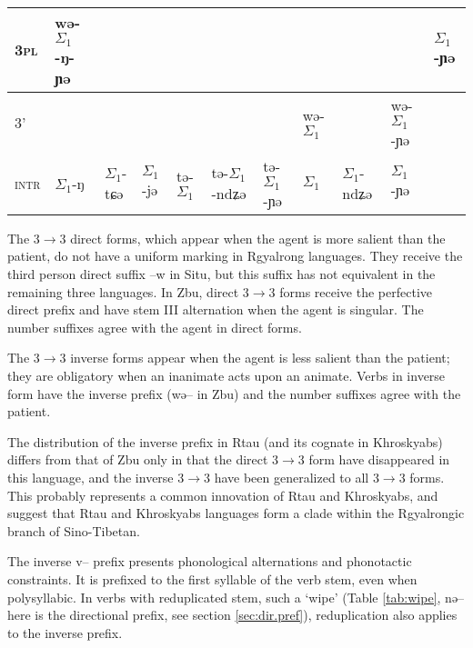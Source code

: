 \documentclass[oneside,a4paper,11pt]{article}
\newcommand{\ipa}[1]{{\phon #1}} %
\newcommand{\grise}[1]{\cellcolor{lightgray}\textbf{#1}}
\newcommand{\ra}{$\Sigma_1$}
\begin{document}
\begin{sidewaystable}[htbp]
{\begin{tabular}{lllllllllll}
\textsc{3pl} &  \cellcolor[wave]{500}	\ipa{wə-\ra{}-ŋ-ɲə} & 	\cellcolor[wave]{500} & \cellcolor[wave]{500} & 	\cellcolor[wave]{500} & 	\cellcolor[wave]{500} & 	\cellcolor[wave]{500} & \multicolumn{3}{c}{\grise{}} &	\ipa{\ra{}-ɲə} \\ 	
\midrule
\textsc{3'} & 	\multicolumn{6}{c}{\grise{}} &\cellcolor[wave]{500}	\ipa{wə-\ra{}} & 	\cellcolor[wave]{500}\ipa{wə-\ra{}-ndʑə} & \cellcolor[wave]{500}	\ipa{wə-\ra{}-ɲə} & 	\grise{} \\	
\midrule
\textsc{intr}&\ipa{\ra{}-ŋ}&\ipa{\ra{}-tɕə}&\ipa{\ra{}-jə}&\ipa{tə-\ra{}}&\ipa{tə-\ra{}-ndʑə}&\ipa{tə-\ra{}-ɲə}&\ipa{\ra{}}&\ipa{\ra{}-ndʑə} &\ipa{\ra{}-ɲə}& 	\grise{} \\	
	\bottomrule
\end{tabular}}
\end{sidewaystable}

The 3$\rightarrow$3 direct forms, which appear  when the agent is more salient than the patient, do not have a uniform marking in Rgyalrong languages. They receive the third person direct suffix \ipa{--w} in Situ, but this suffix has not equivalent in the remaining three languages. In Zbu, direct 3$\rightarrow$3 forms receive  the perfective direct prefix and have stem III alternation when the agent is singular. The number suffixes agree with the agent in direct forms.

The 3$\rightarrow$3 inverse forms appear when the agent is less salient than the patient; they are obligatory when an inanimate acts upon an animate. Verbs in inverse form have the inverse prefix (\ipa{wə}-- in Zbu) and the number suffixes agree with the patient.

The distribution of the inverse prefix in Rtau (and its cognate in Khroskyabs) differs from that of Zbu only in that the direct 3$\rightarrow$3 form have disappeared in this language, and the inverse 3$\rightarrow$3 have been generalized to all 3$\rightarrow$3 forms. This probably represents a common innovation of Rtau and Khroskyabs, and suggest that Rtau and Khroskyabs languages form a clade within the Rgyalrongic branch of Sino-Tibetan.


The inverse \ipa{v}-- prefix presents phonological alternations and phonotactic constraints. It is prefixed to the first syllable of the verb stem, even when polysyllabic. In verbs with reduplicated stem, such a `wipe' (Table \ref{tab:wipe}, \ipa{nə--} here is the directional prefix, see section \ref{sec:dir.pref}), reduplication also applies to the inverse prefix.
\end{document}
